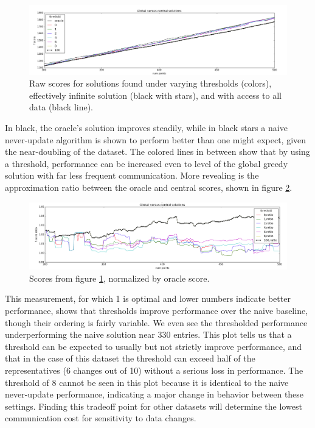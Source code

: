 \begin{figure}
    \centering
    \includegraphics[width=\linewidth]{scores}
    \caption{Raw scores for solutions found under varying thresholds (colors), effectively infinite solution (black with stars), and with access to all data (black line).}
    \label{fig:scores}
\end{figure}

In black, the oracle's solution improves steadily, while in black stars a naive never-update algorithm is shown to perform better than one might expect, given the near-doubling of the dataset. The colored lines in between show that by using a threshold, performance can be increased even to level of the global greedy solution with far less frequent communication. More revealing is the approximation ratio between the oracle and central scores, shown in figure \ref{fig:ratio}.

\begin{figure}
    \centering
    \includegraphics[width=\linewidth]{ratio}
    \caption{Scores from figure \ref{fig:scores}, normalized by oracle score.}
    \label{fig:ratio}
\end{figure}

This measurement, for which 1 is optimal and lower numbers indicate better performance, shows that thresholds improve performance over the naive baseline, though their ordering is fairly variable. We even see the thresholded performance underperforming the naive solution near 330 entries. This plot tells us that a threshold can be expected to usually but not strictly improve performance, and that in the case of this dataset the threshold can exceed half of the representatives (6 changes out of 10) without a serious loss in performance. The threshold of 8 cannot be seen in this plot because it is identical to the naive never-update performance, indicating a major change in behavior between these settings. Finding this tradeoff point for other datasets will determine the lowest communication cost for sensitivity to data changes.